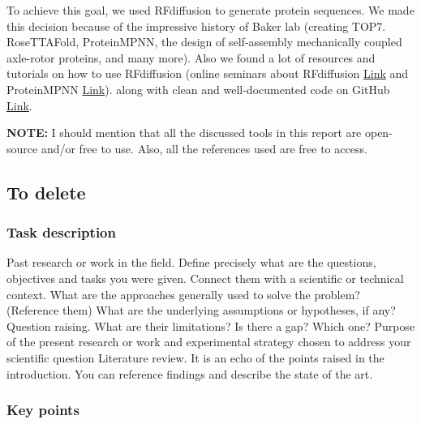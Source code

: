 \documentclass[11pt,a4paper]{article}
\begin{document}
To achieve this goal, we used RFdiffusion to generate protein 
sequences. We made this decision because of the impressive history of
Baker lab (creating TOP7. RoseTTAFold, ProteinMPNN, the design
of self-assembly mechanically coupled axle-rotor proteins, and many more).
Also we found a lot of resources and tutorials on how to use RFdiffusion (online seminars about RFdiffusion
\href{https://www.youtube.com/watch?v=wIHwHDt2NoI}{Link} and ProteinMPNN
\href{https://youtu.be/aVQQuoToTJA?si=PnQvJluY3ZPHo4TO}{Link}).
along with clean and well-documented code on GitHub \href{https://github.com/RosettaCommons/RFdiffusion}{Link}.

\textbf{NOTE:} I should mention that all the discussed tools in this 
report are open-source and/or free to use. Also, all the references used  
are free to access.


\subsection{To delete}

\subsubsection{Task description}
Past research or work in the field.
Define precisely what are the questions, objectives and tasks you were 
given. Connect them with a scientific or technical context.
What are the approaches generally used to solve the problem? 
(Reference them)
What are the underlying assumptions or hypotheses, if any?
Question raising.
What are their limitations? 
Is there a gap? Which one?
Purpose of the present research or work and experimental strategy 
chosen to address your scientific question
Literature review.
It is an echo of the points raised in the introduction. You can 
reference findings and describe the state of the art.

\subsubsection{Key points}
\end{document}
